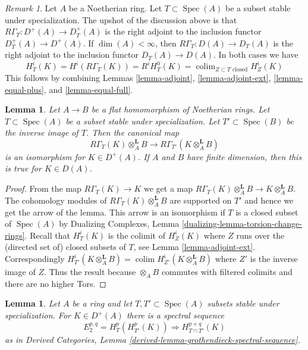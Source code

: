 \documentclass{stacks-project}
\theoremstyle{plain}
\newtheorem{lemma}[subsection]{Lemma}
\theoremstyle{definition}
\theoremstyle{remark}
\newtheorem{remark}[subsection]{Remark}
\numberwithin{equation}{subsection}
\def\colim{\mathop{\mathrm{colim}}\nolimits}
\def\Spec{\mathop{\mathrm{Spec}}}
\begin{document}
\begin{remark}
\label{remark-upshot}
Let $A$ be a Noetherian ring. Let $T \subset \Spec(A)$ be a
subset stable under specialization.
The upshot of the discussion above is that
$R\Gamma_T : D^+(A) \to D_T^+(A)$ is the right adjoint
to the inclusion functor $D_T^+(A) \to D^+(A)$.
If $\dim(A) < \infty$, then
$R\Gamma_T : D(A) \to D_T(A)$ is the right adjoint
to the inclusion functor $D_T(A) \to D(A)$.
In both cases we have
$$
H^i_T(K) = H^i(R\Gamma_T(K)) = R^iH^0_T(K) =
\colim_{Z \subset T\text{ closed}} H^i_Z(K)
$$
This follows by combining
Lemmas \ref{lemma-adjoint}, \ref{lemma-adjoint-ext},
\ref{lemma-equal-plus}, and \ref{lemma-equal-full}.
\end{remark}

\begin{lemma}
\label{lemma-torsion-change-rings}
Let $A \to B$ be a flat homomorphism of Noetherian rings.
Let $T \subset \Spec(A)$ be a subset stable under specialization.
Let $T' \subset \Spec(B)$ be the inverse image of $T$.
Then the canonical map
$$
R\Gamma_T(K) \otimes_A^\mathbf{L} B
\longrightarrow
R\Gamma_{T'}(K \otimes_A^\mathbf{L} B)
$$
is an isomorphism for $K \in D^+(A)$. If $A$ and $B$ have finite
dimension, then this is true for $K \in D(A)$.
\end{lemma}

\begin{proof}
From the map $R\Gamma_T(K) \to K$ we get a map
$R\Gamma_T(K) \otimes_A^\mathbf{L} B \to K \otimes_A^\mathbf{L} B$.
The cohomology modules of $R\Gamma_T(K) \otimes_A^\mathbf{L} B$
are supported on $T'$ and hence we get the arrow of the lemma.
This arrow is an isomorphism if $T$ is a closed subset of $\Spec(A)$ by
Dualizing Complexes, Lemma \ref{dualizing-lemma-torsion-change-rings}.
Recall that $H^i_T(K)$ is the colimit of $H^i_Z(K)$ where $Z$ runs over
the (directed set of) closed subsets of $T$, see
Lemma \ref{lemma-adjoint-ext}.
Correspondingly
$H^i_{T'}(K \otimes_A^\mathbf{L} B) =
\colim H^i_{Z'}(K \otimes_A^\mathbf{L} B)$ where $Z'$ is the inverse
image of $Z$. Thus the result because $\otimes_A B$ commutes
with filtered colimits and there are no higher Tors.
\end{proof}

\begin{lemma}
\label{lemma-local-cohomology-ss}
Let $A$ be a ring and let $T, T' \subset \Spec(A)$ subsets
stable under specialization. For $K \in D^+(A)$
there is a spectral sequence
$$
E_2^{p, q} = H^p_T(H^p_{T'}(K)) \Rightarrow H^{p + q}_{T \cap T'}(K)
$$
as in Derived Categories, Lemma
\ref{derived-lemma-grothendieck-spectral-sequence}.
\end{lemma}
\end{document}
